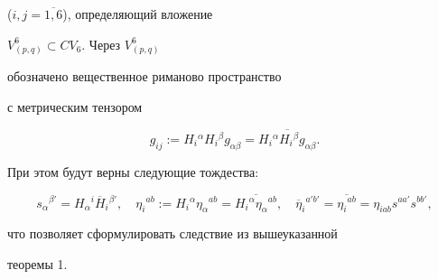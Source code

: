 \cite{7} ($i,j=\overline{1,6}$), определяющий вложение


$V^6_{(p,q)}\subset CV_6$. Через $V^6_{(p,q)}$


обозначено вещественное риманово пространство


с метрическим тензором


$$




g_{ij}:=H_i{}^\alpha H_i{}^\beta g_{\alpha\beta}=


\overline{H_i{}^\alpha H_i{}^\beta g_{\alpha\beta}}.


$$


При этом будут верны следующие тождества:


\begin{equation}


\label{e46a}


s_\alpha{}^{\beta '}=H_\alpha{}^i \overline H_i{}^{\beta '},\quad


\eta_i{}^{ab}:=H_i{}^\alpha\eta_\alpha{}^{ab}=


\overline{H_i{}^\alpha\eta_\alpha{}^{ab}},\quad


\overline \eta_i{}^{a'b'}=\overline{\eta_i{}^{ab}}=


\eta_{iab}s^{aa'}s^{bb'},


\end{equation}


что позволяет сформулировать следствие из вышеуказанной


теоремы 1.






